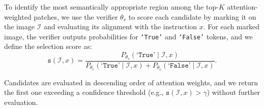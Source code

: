 \documentclass{article}
\begin{document}
To identify the most semantically appropriate region among the top-$K$ attention-weighted patches, we use the verifier $\theta_v$ to score each candidate by marking it on the image $\mathcal{I}$ and evaluating its alignment with the instruction $x$. For each marked image, the verifier outputs probabilities for \texttt{`True'} and \texttt{`False'} tokens, and we define the selection score as:  
\begin{equation}
\texttt{s}(\mathcal{I}, x) = \frac{P_{\theta_v}(\texttt{`True'} \mid \mathcal{I}, x)}{P_{\theta_v}(\texttt{`True'} \mid \mathcal{I}, x) + P_{\theta_v}(\texttt{`False'} \mid \mathcal{I}, x)}.
\end{equation}

Candidates are evaluated in descending order of attention weights, and we return the first one exceeding a confidence threshold (e.g., $\texttt{s}(\mathcal{I}, x) > \gamma$) without further evaluation.


\end{document}
